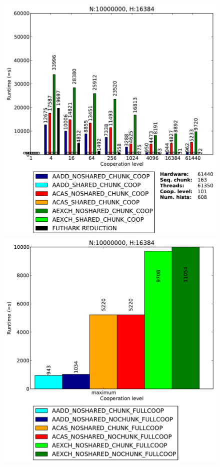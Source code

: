 \begin{figure}
\begin{minipage}{0.5\textwidth}
\end{minipage}
\begin{minipage}{0.5\textwidth}
\includegraphics[scale=0.35]{input/content/figures/experiment/hist-16384}
\end{minipage}
\begin{minipage}{0.5\textwidth}
\includegraphics[scale=0.35]{input/content/figures/experiment/hist-16384-full}

\end{minipage}
\end{figure}
